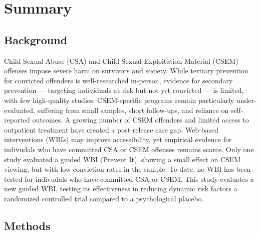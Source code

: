 \documentclass[
  super,
  preprint,
  1p,
  onecolumn]{elsarticle}
\begin{document}
\begin{frontmatter}















        





\end{frontmatter}
    

\section*{Summary}\label{summary}

\subsection*{Background}\label{background}

Child Sexual Abuse (CSA) and Child Sexual Exploitation Material (CSEM)
offenses impose severe harm on survivors and society. While tertiary
prevention for convicted offenders is well-researched in-person,
evidence for secondary prevention --- targeting individuals at risk but
not yet convicted --- is limited, with few high-quality studies.
CSEM-specific programs remain particularly under-evaluated, suffering
from small samples, short follow-ups, and reliance on self-reported
outcomes. A growing number of CSEM offenders and limited access to
outpatient treatment have created a post-release care gap. Web-based
interventions (WBIs) may improve accessibility, yet empirical evidence
for indivudals who have committed CSA or CSEM offenses remains scarce.
Only one study evaluated a guided WBI (Prevent It), showing a small
effect on CSEM viewing, but with low conviction rates in the sample. To
date, no WBI has been tested for indivudals who have committed CSA or
CSEM. This study evaluates a new guided WBI, testing its effectiveness
in reducing dynamic risk factors a randomized controlled trial compared
to a psychological placebo.

\subsection*{Methods}\label{methods}
\end{document}
